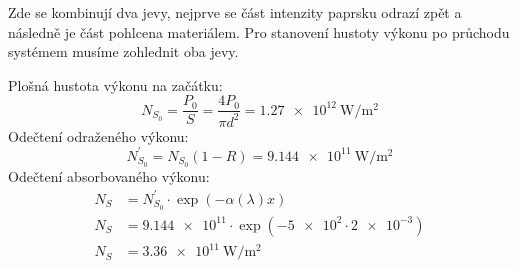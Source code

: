 Zde se kombinují dva jevy, nejprve se část intenzity paprsku odrazí zpět a následně je část pohlcena materiálem. Pro stanovení hustoty výkonu po průchodu systémem musíme zohlednit oba jevy. 

Plošná hustota výkonu na začátku:
\[
    N_{S_{0} } =\frac{P_{0}}{S}=\frac{4P_{0}}{\pi d^2} = \qty{1,27e12}{\watt\per\square\meter} 
\]
Odečtení odraženého výkonu: 
\[
    N_{S_{0} }^\prime = N_{S_{0} } (1-R)=\qty{9,144e11}{\watt\per\square\meter}
\]
Odečtení absorbovaného výkonu: 
\begin{align*}
  N_{S} &= N_{S_{0} }^\prime\cdot \exp(-\alpha(\lambda)x) \\
  N_{S} &= \num{9,144e11}\cdot \exp(-\num{5e2}\cdot \num{2e-3}) \\
  N_{S} &= \qty{3,36e11}{\watt\per\square\meter}
\end{align*}
 
